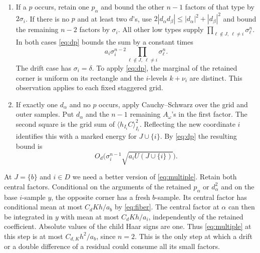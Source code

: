 \documentclass[11pt]{article}
\newcommand{\avg}[2]{\langle #1\rangle_{#2}}
\begin{document}
\begin{enumerate}
\item If a \(p\) occurs, retain one \(p_\alpha\) and bound the
other \(n-1\) factors of that type by \(2\sigma_i\).
If there is no \(p\) and at least two \(d\)'s, use
\(2|d_\alpha d_\beta|\le |d_\alpha|^2+|d_\beta|^2\) and bound
the remaining \(n-2\) factors by \(\sigma_i\).
All other low types supply \(\prod_{\ell\notin J,\ \ell\ne i}\sigma_\ell^n\).
In both cases \eqref{eq:dp} bounds the sum by a constant times
\begin{equation}\label{eq:multiple}
         a_i\sigma_i^{n-2}
                \prod_{\ell\notin J,\ \ell\ne i}\sigma_\ell^n .
\end{equation}
The drift case has \(\sigma_i=\delta\). To apply \eqref{eq:dp}, the
marginal of the retained corner is uniform on its rectangle and
the \(i\)-levels \(k+\nu_i\) are distinct. This observation applies
to each fixed staggered grid.

\item If exactly one \(d_\alpha\) and no \(p\) occurs, apply
Cauchy--Schwarz over the grid and outer samples. Put \(d_\alpha\)
and the \(n-1\) remaining \(A_\omega\)'s in the first factor.
The second square is the grid sum of \(\avg{h_{I_i} C}{I_i}^2\).
Reflecting the new coordinate \(i\) identifies this with a marked
energy for \(J\cup\{i\}\). By \eqref{eq:dp} the resulting bound is
\begin{equation}\label{eq:single}
               O_d\big(\sigma_i^{n-1}\sqrt{a_i U(J\cup\{i\})}\big).
\end{equation}
\end{enumerate}

At \(J=\{b\}\) and \(i\in D\) we need a better version of
\eqref{eq:multiple}. Retain both central factors. Conditional on the
arguments of the retained \(p_\alpha\) or \(d_\alpha^2\) and on the
base \(i\)-sample \(y\), the opposite corner has a fresh \(b\)-sample.
Its central factor has conditional mean at most \(C_dKh/a_b\) by
\eqref{eq:fiber}. The central factor at \(\alpha\) can then be
integrated in \(y\) with mean at most \(C_dKh/a_i\), independently
of the retained coefficient. Absolute values of the child Haar signs
are one. Thus \eqref{eq:multiple} at this step is at most
\(C_{d,K}h^2/a_b\), since \(n=2\). This is the only step at which a
drift or a double difference of a residual could consume all its
small factors.
\end{document}

